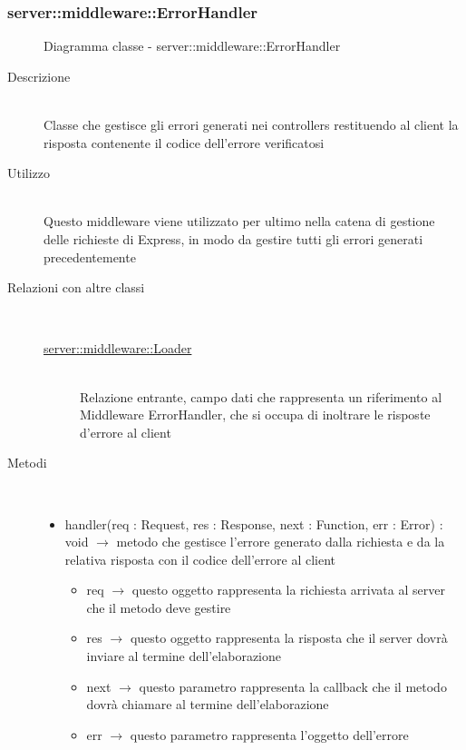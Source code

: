 \subsubsection[ErrorHandler]{server::middleware::ErrorHandler}
\begin{figure}[H]
	\centering
	\caption{Diagramma classe - server::middleware::ErrorHandler}
\end{figure}\begin{description}
\item[Descrizione] \hfill \\
Classe che gestisce gli errori generati nei controllers restituendo al client la risposta contenente il codice dell'errore verificatosi
\item[Utilizzo] \hfill \\
Questo middleware viene utilizzato per ultimo nella catena di gestione delle richieste di Express, in modo da gestire tutti gli errori generati precedentemente
\item[Relazioni con altre classi] \hfill \\
\vspace{-7mm}
\begin{description}
	\item[\hyperlink{server::middleware::Loader}{server::middleware::Loader}] \hfill \\
	Relazione entrante, campo dati che rappresenta un riferimento al Middleware ErrorHandler, che si occupa di inoltrare le risposte d'errore al client
\end{description}

\item[Metodi] \hfill \\
\vspace{-7mm}
\begin{itemize}
	\item handler(req : Request, res : Response, next : Function, err : Error) : void $\rightarrow$ metodo che gestisce l'errore generato dalla richiesta e da la relativa risposta con il codice dell'errore al client\begin{itemize}
		\item req $\rightarrow$ questo oggetto rappresenta la richiesta arrivata al server che il metodo deve gestire	
		\item res $\rightarrow$ questo oggetto rappresenta la risposta che il server dovrà inviare al termine dell'elaborazione	
		\item next $\rightarrow$ questo parametro rappresenta la callback che il metodo dovrà chiamare al termine dell'elaborazione	
		\item err $\rightarrow$ questo parametro rappresenta l'oggetto  dell'errore
	\end{itemize}
	

\end{itemize}
\end{description}

